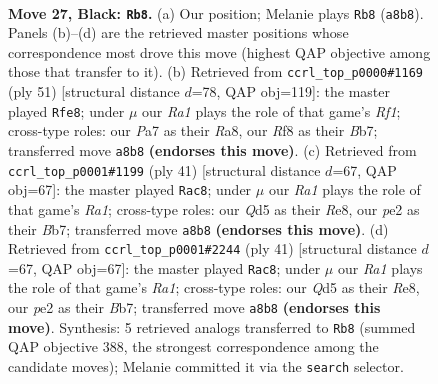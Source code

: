 \documentclass[11pt]{article}
\begin{document}
\clearpage

\begin{figure}[p]\centering
\begin{subfigure}{0.46\textwidth}\centering
\resizebox{\linewidth}{!}{%
\newchessgame
\chessboard[
  setfen={r1b2rk1/p2nb2p/8/2pq4/Pp1p1P2/1P4N1/2Q1PK2/RNBR4 b - - 1 27},
  showmover=false,
  pgfstyle=straightmove, color=movearrow, markmove={a8-b8}
]}
\caption{}
\end{subfigure}\hfill
\begin{subfigure}{0.46\textwidth}\centering
\resizebox{\linewidth}{!}{%
\newchessgame
\chessboard[
  setfen={r4r2/1bp2qbk/5np1/p3R2p/1p5P/3B2Q1/PPP2NP1/1K1N3R b - - 0 26},
  showmover=false,
  pgfstyle=straightmove, color=movearrow, markmove={f8-e8}
]}
\caption{}
\end{subfigure}
\\[4pt]
\begin{subfigure}{0.46\textwidth}\centering
\resizebox{\linewidth}{!}{%
\newchessgame
\chessboard[
  setfen={r3r1k1/pb2pp1p/1nq3p1/8/2p5/2N1QPP1/PPPRB2P/2K4R b - - 3 21},
  showmover=false,
  pgfstyle=straightmove, color=movearrow, markmove={a8-c8}
]}
\caption{}
\end{subfigure}\hfill
\begin{subfigure}{0.46\textwidth}\centering
\resizebox{\linewidth}{!}{%
\newchessgame
\chessboard[
  setfen={r3r1k1/pb2pp1p/1nq3p1/8/2p5/2N1QPP1/PPPRB2P/2K4R b - - 3 21},
  showmover=false,
  pgfstyle=straightmove, color=movearrow, markmove={a8-c8}
]}
\caption{}
\end{subfigure}
\caption{\textbf{Move 27, Black: \texttt{Rb8}.} (a) Our position; Melanie plays \texttt{Rb8} (\texttt{a8b8}). Panels (b)--(d) are the retrieved master positions whose correspondence most drove this move (highest QAP objective among those that transfer to it). (b) Retrieved from \texttt{ccrl\_top\_p0000\#1169} (ply 51) [structural distance $d$=78, QAP obj=119]: the master played \texttt{Rfe8}; under $\mu$ our \emph{Ra1} plays the role of that game's \emph{Rf1}; cross-type roles: our \emph{P}a7 as their \emph{R}a8, our \emph{R}f8 as their \emph{B}b7; transferred move \texttt{a8b8} \textbf{(endorses this move)}. (c) Retrieved from \texttt{ccrl\_top\_p0001\#1199} (ply 41) [structural distance $d$=67, QAP obj=67]: the master played \texttt{Rac8}; under $\mu$ our \emph{Ra1} plays the role of that game's \emph{Ra1}; cross-type roles: our \emph{Q}d5 as their \emph{R}e8, our \emph{p}e2 as their \emph{B}b7; transferred move \texttt{a8b8} \textbf{(endorses this move)}. (d) Retrieved from \texttt{ccrl\_top\_p0001\#2244} (ply 41) [structural distance $d$=67, QAP obj=67]: the master played \texttt{Rac8}; under $\mu$ our \emph{Ra1} plays the role of that game's \emph{Ra1}; cross-type roles: our \emph{Q}d5 as their \emph{R}e8, our \emph{p}e2 as their \emph{B}b7; transferred move \texttt{a8b8} \textbf{(endorses this move)}. Synthesis: 5 retrieved analogs transferred to \texttt{Rb8} (summed QAP objective 388, the strongest correspondence among the candidate moves); Melanie committed it via the \texttt{search} selector.}
\label{fig:thought-m53}
\end{figure}
\end{document}
